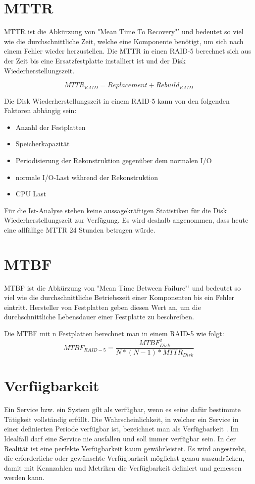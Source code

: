 \section{MTTR}
MTTR  ist die Abkürzung von "Mean Time To Recovery"' und bedeutet so viel wie die durchschnittliche Zeit, welche eine Komponente benötigt, um sich nach einem Fehler wieder herzustellen. Die MTTR in einen RAID-5 berechnet sich aus der Zeit bis eine Ersatzfestplatte installiert ist und der Disk Wiederherstellungszeit. 

\begin{equation}
MTTR_{RAID}=Replacement+Rebuild_{RAID}
\label{eqn:MTBF-RAID-5}
\end{equation}

Die Disk Wiederherstellungszeit in einem RAID-5 kann von den folgenden Faktoren abhängig sein:
\begin{itemize}
\item Anzahl der Festplatten
\item Speicherkapazität
\item Periodisierung der Rekonstruktion gegenüber dem normalen I/O
\item  normale I/O-Last während der Rekonstruktion
\item  CPU Last
\end{itemize}

Für die Ist-Analyse stehen keine aussagekräftigen Statistiken für die Disk Wiederherstellungszeit zur Verfügung. Es wird deshalb angenommen, dass heute eine allfällige MTTR 24 Stunden betragen würde.


\section{MTBF}
MTBF ist die Abkürzung von "Mean Time Between Failure"' und bedeutet so viel wie die durchschnittliche Betriebszeit einer Komponenten bis ein Fehler eintritt. Hersteller von Festplatten geben diesen Wert an, um die durchschnittliche Lebensdauer einer Festplatte zu beschreiben. 

Die MTBF mit n Festplatten berechnet man in einem RAID-5 \cite{Chen1994} wie folgt:
\begin{equation}
MTBF_{RAID-5}=\frac{MTBF_{Disk}^2}{N*(N-1)*MTTR_{Disk}}
\label{eqn:MTBF-RAID-5}
\end{equation}

\section{Verfügbarkeit}
Ein Service bzw. ein System gilt als verfügbar, wenn es seine dafür bestimmte Tätigkeit vollständig erfüllt. Die Wahrscheinlichkeit, in welcher ein Service in einer definierten Periode verfügbar ist, bezeichnet man als Verfügbarkeit \cite{Held2004}. Im Idealfall darf eine Service nie ausfallen und soll immer verfügbar sein. In der Realität ist eine perfekte Verfügbarkeit kaum gewährleistet. Es wird angestrebt, die erforderliche oder gewünschte Verfügbarkeit möglichst genau auszudrücken, damit mit Kennzahlen und Metriken die Verfügbarkeit definiert und gemessen werden kann. 

